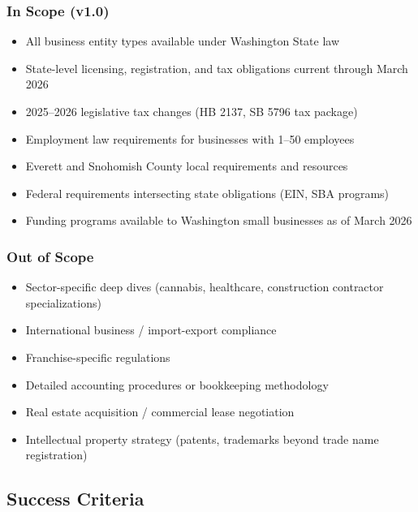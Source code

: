 \documentclass[11pt,letterpaper]{article}
\begin{document}
\subsubsection*{In Scope (v1.0)}
\begin{itemize}[leftmargin=2em]
  \item All business entity types available under Washington State law
  \item State-level licensing, registration, and tax obligations current through March 2026
  \item 2025--2026 legislative tax changes (HB 2137, SB 5796 tax package)
  \item Employment law requirements for businesses with 1--50 employees
  \item Everett and Snohomish County local requirements and resources
  \item Federal requirements intersecting state obligations (EIN, SBA programs)
  \item Funding programs available to Washington small businesses as of March 2026
\end{itemize}

\subsubsection*{Out of Scope}
\begin{itemize}[leftmargin=2em]
  \item Sector-specific deep dives (cannabis, healthcare, construction contractor specializations)
  \item International business / import-export compliance
  \item Franchise-specific regulations
  \item Detailed accounting procedures or bookkeeping methodology
  \item Real estate acquisition / commercial lease negotiation
  \item Intellectual property strategy (patents, trademarks beyond trade name registration)
\end{itemize}

\subsection{Success Criteria}
\end{document}
